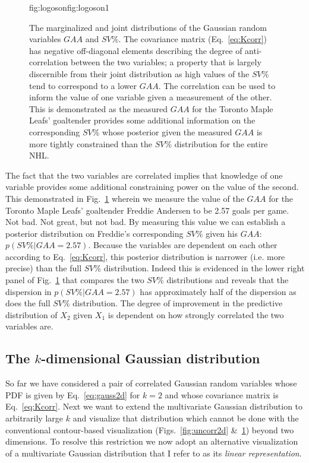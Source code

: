 \begin{figure}
\begin{ocg}{fig:logoson}{fig:logoson}{1}
  \end{ocg}
  \hspace{-0.9\hsize}%
  \caption[Correlated Gaussian random variables in two dimensions.]
      {The marginalized and joint distributions of the Gaussian random
    variables $GAA$ and $SV$\%.
    The covariance matrix (Eq.~\ref{eq:Kcorr}) has negative off-diagonal
    elements describing the degree of anti-correlation between the two
    variables; a property that is largely discernible from their joint
    distribution as high values of the $SV$\% tend to correspond to a lower
    $GAA$. The correlation can be used to inform the value of one variable given a
    measurement of the other. This is demonstrated as the measured $GAA$ 
    for the Toronto Maple Leafs' goaltender 
    provides some
    additional information on the corresponding $SV$\% whose posterior given the
    measured $GAA$ is more tightly constrained than the $SV$\% distribution for
    the entire NHL.}
  \label{fig:corr2d}
\end{figure}

The fact that the two variables are
correlated implies that knowledge of one variable provides some additional constraining
power on the value of the second. This demonstrated in Fig.~\ref{fig:corr2d}
wherein we measure the value of the $GAA$ for the Toronto Maple Leafs' goaltender
Freddie Andersen
to be 2.57 goals per game. Not bad. Not great, but not bad. By measuring
this value we can establish a posterior distribution on Freddie's corresponding
$SV$\% given his $GAA$: $p(SV\%|GAA=2.57)$. Because the variables are dependent
on each other according to Eq.~\ref{eq:Kcorr}, this posterior distribution is
narrower (i.e. more precise) than the full $SV$\% distribution. Indeed this is
evidenced in the lower right panel of Fig.~\ref{fig:corr2d} that compares the
two $SV$\% distributions and reveals that the dispersion in $p(SV\%|GAA=2.57)$
has approximately half of the dispersion as does the full $SV$\% distribution. The degree
of improvement in the predictive distribution of $X_2$ given $X_1$ is dependent
on how strongly correlated the two variables are. \\

\subsection{The $k$-dimensional Gaussian distribution}
So far we have considered a pair of correlated Gaussian random variables whose
PDF is given by Eq.~\ref{eq:gauss2d} for $k=2$ and whose covariance matrix is 
Eq.~\ref{eq:Kcorr}. Next we want to extend the multivariate
Gaussian distribution to arbitrarily large $k$ and visualize that distribution which
cannot be done with the conventional contour-based visualization
(Figs.~\ref{fig:uncorr2d} \&~\ref{fig:corr2d}) beyond two dimensions. To resolve this
restriction we now adopt an alternative visualization of a multivariate Gaussian
distribution that I refer to as its \emph{linear representation}. \\

